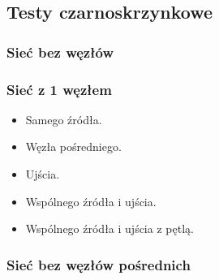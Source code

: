 \subsection{Testy czarno\dywiz skrzynkowe}

\subsubsection{Sieć bez węzłów}


\subsubsection{Sieć z 1 węzłem}

\begin{itemize}[nosep]
    \item Samego źródła.
    \item Węzła pośredniego.
    \item Ujścia.
    \item Wspólnego źródła i ujścia.
    \item Wspólnego źródła i ujścia z pętlą.
\end{itemize}


\subsubsection{Sieć bez węzłów pośrednich}

